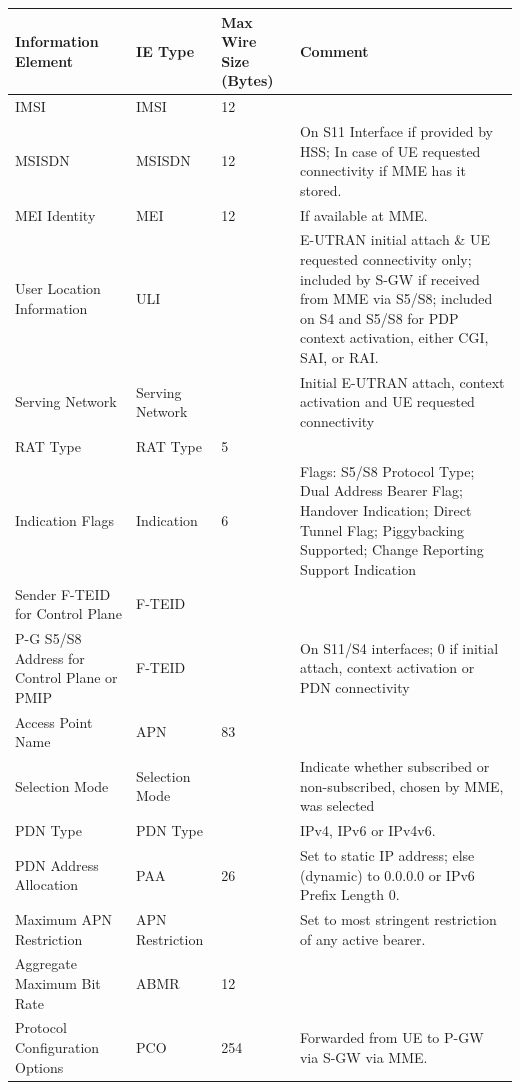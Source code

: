 \begin{longtabu} to\linewidth{| X[2,l] | X[2,c] | X[l] | X[4] |}
\hline
Information Element 						& IE Type 					& Max Wire Size (Bytes)	& Comment \\ \hline
IMSI 										& IMSI 						& 12					& \\ \hline
MSISDN 										& MSISDN					& 12					& On S11 Interface if provided by HSS; In case of UE requested connectivity if MME has it stored. \\ \hline
MEI Identity 								& MEI 						& 12					& If available at MME. \\ \hline
User Location Information 					& ULI						& 						& E-UTRAN initial attach \&  UE requested connectivity only; included by S-GW if received from MME via S5/S8; included on S4 and S5/S8 for PDP context activation, either CGI, SAI, or RAI. \\ \hline
Serving Network								& Serving Network			& 						& Initial E-UTRAN attach, context activation and UE requested connectivity \\ \hline
RAT Type									& RAT Type					& 5						& \\ \hline
Indication Flags							& Indication				& 6						& Flags: S5/S8 Protocol Type; Dual Address Bearer Flag; Handover Indication; Direct Tunnel Flag; Piggybacking Supported; Change Reporting Support Indication \\ \hline
Sender F-TEID for Control Plane				& F-TEID					& 						& \\ \hline
P-G S5/S8 Address for Control Plane or PMIP	& F-TEID					& 						& On S11/S4 interfaces; 0 if initial attach, context activation or PDN connectivity \\ \hline
Access Point Name							& APN						& 83					& \\ \hline
Selection Mode								& Selection Mode			& 						& Indicate whether subscribed or non-subscribed, chosen by MME, was selected \\ \hline
PDN Type									& PDN Type					& 						& IPv4, IPv6 or IPv4v6. \\ \hline
PDN Address Allocation						& PAA						& 26					& Set to static IP address; else (dynamic) to 0.0.0.0 or IPv6 Prefix Length 0. \\ \hline
Maximum APN Restriction						& APN Restriction			& 						& Set to most stringent restriction of any active bearer. \\ \hline
Aggregate Maximum Bit Rate					& ABMR						& 12					& \\ \hline
Protocol Configuration Options				& PCO						& 254					& Forwarded from UE to P-GW via S-GW via MME. \\ \hline

\end{longtabu}
